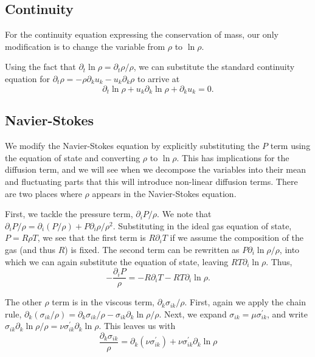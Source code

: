 \documentclass[letterpaper,12pt]{paper}
\newcommand{\lnrho}{\ensuremath{\ln \rho}}
\begin{document}
\subsection{Continuity}
\label{sec:continuity}

For the continuity equation expressing the conservation of mass, our
only modification is to change the variable from $\rho$ to $\lnrho$.

Using the fact that $\partial_t \lnrho = \partial_t \rho/\rho$, we can
substitute the standard continuity equation for $\partial_t \rho =
-\rho \partial_k u_k - u_k \partial_k \rho$ to arrive at 
\begin{equation}
  \label{eq:lnrho_continuity}
  \partial_t \lnrho + u_k \partial_k \lnrho + \partial_k u_k = 0.
\end{equation}

\subsection{Navier-Stokes}
\label{sec:ns}
We modify the Navier-Stokes equation by explicitly substituting the
$P$ term using the equation of state and converting $\rho$ to
$\lnrho$. This has implications for the diffusion term, and we will
see when we decompose the variables into their mean and fluctuating
parts that this will introduce non-linear diffusion terms. There are
two places where $\rho$ appears in the Navier-Stokes equation.

First, we tackle the pressure term, $\partial_i P/\rho$. We note that
$\partial_i P/\rho = \partial_i (P/\rho) + P \partial_i
\rho/\rho^2$.
Substituting in the ideal gas equation of state, $P = R \rho T$, we
see that the first term is $R \partial_i T$ if we assume the
composition of the gas (and thus $R$) is fixed. The second term can be
rewritten as $P \partial_i \lnrho/\rho$, into which we can again
substitute the equation of state, leaving $R T \partial_i
\lnrho$. Thus, 
\begin{equation}
  \label{eq:press_term}
  -\frac{\partial_i P}{\rho} = -R \partial_i T - R T \partial_i \lnrho.
\end{equation}

The other $\rho$ term is in the viscous term, $\partial_k
\sigma_{ik}/\rho$. First, again we apply the chain rule, $\partial_k
(\sigma_{ik}/\rho) = \partial_k \sigma_{ik}/\rho -
\sigma_{ik} \partial_k \lnrho/\rho$. Next, we expand $\sigma_{ik} = \mu
\sigma^{'}_{ik}$, and write $\sigma_{ik} \partial_k \lnrho/\rho = \nu
\sigma^{'}_{ik} \partial_k \lnrho$. This leaves us with 
\begin{equation}
  \label{eq:visc_term}
  \frac{\partial_k \sigma_{ik}}{\rho} = \partial_k (\nu
  \sigma^{'}_{ik}) + \nu \sigma^{'}_{ik} \partial_k \lnrho
\end{equation}
\end{document}
